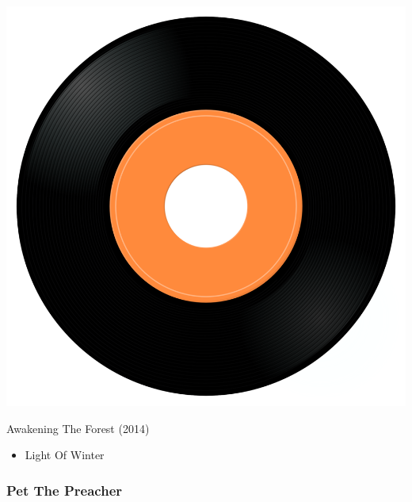 \begin{minipage}[t]{0.25\textwidth}\vspace{0pt}
\captionsetup{type=figure}
\includegraphics[width=\textwidth]{Images/cover.png}
\caption*{Awakening The Forest (2014)}
\end{minipage}
\begin{minipage}[t]{0.25\textwidth}\vspace{0pt}
\begin{itemize}[nosep,leftmargin=1em,labelwidth=*,align=left]
	\setlength{\itemsep}{0pt}
	\item Light Of Winter
\end{itemize}
\end{minipage}

\subsubsection{Pet The Preacher}

